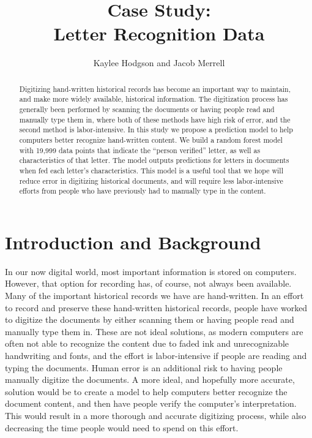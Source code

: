 \documentclass{svproc}
\begin{document}
\mainmatter              
\title{Case Study: \\ Letter Recognition Data}
%
\author{Kaylee Hodgson and Jacob Merrell}
%

\maketitle

\begin{abstract}
Digitizing hand-written historical records has become an important way to maintain, and make more widely available, historical information. The digitization process has generally been performed by scanning the documents or having people read and manually type them in, where both of these methods have high risk of error, and the second method is labor-intensive. In this study we propose a prediction model to help computers better recognize hand-written content. We build a random forest model with 19,999 data points that indicate the ``person verified'' letter, as well as characteristics of that letter. The model outputs predictions for letters in documents when fed each letter's characteristics. This model is a useful tool that we hope will reduce error in digitizing historical documents, and will require less labor-intensive efforts from people who have previously had to manually type in the content.
\end{abstract}

\section{Introduction and Background}

In our now digital world, most important information is stored on computers. However, that option for recording has, of course, not always been available. Many of the important historical records we have are hand-written. In an effort to record and preserve these hand-written historical records, people have worked to digitize the documents by either scanning them or having people read and manually type them in. These are not ideal solutions, as modern computers are often not able to recognize the content due to faded ink and unrecognizable handwriting and fonts, and the effort is labor-intensive if people are reading and typing the documents. Human error is an additional risk to having people manually digitize the documents. A more ideal, and hopefully more accurate, solution would be to create a model to help computers better recognize the document content, and then have people verify the computer's interpretation. This would result in a more thorough and accurate digitizing process, while also decreasing the time people would need to spend on this effort.
\end{document}
